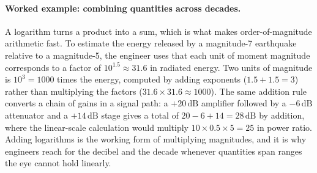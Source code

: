 \paragraph{Worked example: combining quantities across decades.}
A logarithm turns a product into a sum, which is what makes
order-of-magnitude arithmetic fast. To estimate the energy released
by a magnitude-7 earthquake relative to a magnitude-5, the engineer
uses that each unit of moment magnitude corresponds to a factor of
$10^{1.5} \approx 31.6$ in radiated energy. Two units of magnitude is
$10^{3} = 1000$ times the energy, computed by adding exponents
($1.5 + 1.5 = 3$) rather than multiplying the factors ($31.6 \times
31.6 \approx 1000$). The same addition rule converts a chain of gains
in a signal path: a $+20\,\si{\deci\bel}$ amplifier followed by a
$-6\,\si{\deci\bel}$ attenuator and a $+14\,\si{\deci\bel}$ stage
gives a total of $20 - 6 + 14 = 28\,\si{\deci\bel}$ by addition,
where the linear-scale calculation would multiply $10 \times 0.5
\times 5 = 25$ in power ratio. Adding logarithms is the working form
of multiplying magnitudes, and it is why engineers reach for the
decibel and the decade whenever quantities span ranges the eye cannot
hold linearly.


